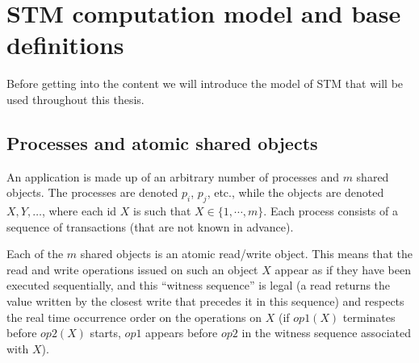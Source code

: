 















































\section{STM computation model and base definitions}
\label{sec:model-and-conditions}



Before getting into the content we will introduce the model of STM that will be used
throughout this thesis.

\subsection{Processes  and atomic shared objects}
An application is made up of  an  arbitrary number  of  processes  and  $m$
shared  objects.  The processes are denoted $p_i$, $p_j$, etc., 
while the  objects are  denoted $X,Y,\ldots$, where each id $X$ is such 
that $X \in \{1,\cdots,m\}$.   Each process consists of  a sequence of 
transactions (that are not known in advance).

Each of the $m$ shared objects is an atomic read/write object. 
This means  that the read and  write operations issued on  such an  object
$X$  appear as  if they have  been executed  sequentially, and this 
``witness sequence'' is  legal (a read returns the value written by the  
closest write  that precedes it in this sequence) and respects the real time 
occurrence  order on the operations on $X$ (if  $op1(X)$  terminates  before
$op2(X)$  starts, $op1$ appears before $op2$ in the witness sequence 
associated with $X$). 




